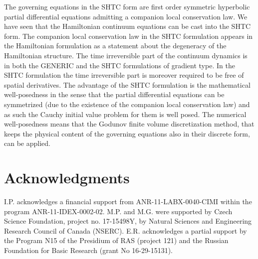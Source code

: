 \documentclass[twoside]{article}
\begin{document}
The governing equations in the SHTC form  are first order symmetric hyperbolic 
partial differential equations admitting a companion local conservation law. We 
have seen that the Hamiltonian continuum equations can be cast into the SHTC  
form. The companion local conservation law in the SHTC formulation appears  in 
the Hamiltonian formulation as a statement about the degeneracy of the 
Hamiltonian structure. The time irreversible part of the continuum dynamics is 
in both the GENERIC and the SHTC formulations of gradient type. In the SHTC  
formulation the time irreversible part  is moreover required to be free of 
spatial 
derivatives. The advantage of the SHTC formulation is the mathematical 
well-posedness in the sense that the partial differential equations can be 
symmetrized (due to the existence of the companion local conservation law) and 
as such the Cauchy initial value problem for them is well posed. The numerical 
well-posedness means that the Godunov finite volume discretization method, that 
keeps the physical content of the governing equations also in their discrete 
form, can be applied.

%

\section*{Acknowledgments}
I.P. acknowledges a financial support from ANR-11-LABX-0040-CIMI within the 
program ANR-11-IDEX-0002-02.
M.P. and M.G. were supported by Czech Science Foundation, project no. 
17-15498Y, by Natural Sciences and Engineering Research Council of Canada 
(NSERC). E.R. acknowledges a partial support by the Program N15 of the 
Presidium of RAS (project 121) and the Russian Foundation for Basic Research 
(grant No 16-29-15131).

\appendix
\end{document}

